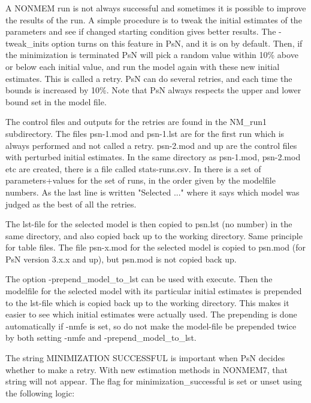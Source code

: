 A NONMEM run is not always successful and sometimes it is possible to improve the results of the run. A simple procedure is to tweak the initial 
estimates of the parameters and see if changed starting condition gives better results. The -tweak\_inits option turns on this feature in PsN, 
and it is on by default. Then, if the minimization is terminated PsN will pick a random value within 10\% above or below each initial value, 
and run the model again with these new initial estimates. This is called a retry. PsN can do several retries, and each time the bounds is 
increased by 10\%. Note that PsN always respects the upper and lower bound set in the model file. 

The control files and outputs for the retries are found in the NM\_run1 subdirectory. The files psn-1.mod and psn-1.lst are for 
the first run which is always performed and not called a retry. psn-2.mod and up are the control files with perturbed initial 
estimates. In the same directory as psn-1.mod, psn-2.mod etc are created, there is a file called stats-runs.csv. In there is a 
set of parameters+values for the set of runs, in the order given by the modelfile numbers. As the last line is 
written "Selected ..." where it says which model was judged as the best of all the retries.

The lst-file for the selected model is then copied to psn.lst (no number) in the same directory, and also copied back 
up to the working directory. Same principle for table files. The file psn-x.mod for the selected model is copied 
to psn.mod (for PsN version 3.x.x and up), but psn.mod is not copied back up.   	

The option -prepend\_model\_to\_lst can be used with execute. Then the modelfile for the selected model with its 
particular initial estimates is prepended to the lst-file which is copied back up to the working directory. This makes it 
easier to see which initial estimates were actually used. The prepending is done automatically if -nmfe is set, so do not 
make the model-file be prepended twice by both setting -nmfe and -prepend\_model\_to\_lst.

The string MINIMIZATION SUCCESSFUL is important when PsN decides whether to make a retry. With new estimation 
methods in NONMEM7, that string will not appear. The flag for minimization\_successful is set or unset using the following logic:

